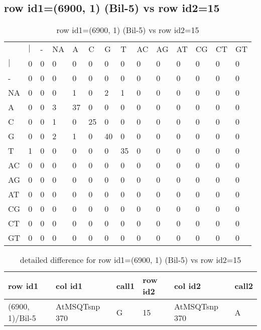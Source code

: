 \subsection{row id1=(6900, 1) (Bil-5) vs row id2=15}
\begin{center}
\begin{longtable}{|l|l|l|l|l|l|l|l|l|l|l|l|l|l|}
\caption{row id1=(6900, 1) (Bil-5) vs row id2=15} \label{table_dm66}\\
\hline
\\
\hline
&$|$&-&NA&A&C&G&T&AC&AG&AT&CG&CT&GT\\
$|$&0&0&0&0&0&0&0&0&0&0&0&0&0\\
-&0&0&0&0&0&0&0&0&0&0&0&0&0\\
NA&0&0&0&1&0&2&1&0&0&0&0&0&0\\
A&0&0&3&37&0&0&0&0&0&0&0&0&0\\
C&0&0&1&0&25&0&0&0&0&0&0&0&0\\
G&0&0&2&1&0&40&0&0&0&0&0&0&0\\
T&1&0&0&0&0&0&35&0&0&0&0&0&0\\
AC&0&0&0&0&0&0&0&0&0&0&0&0&0\\
AG&0&0&0&0&0&0&0&0&0&0&0&0&0\\
AT&0&0&0&0&0&0&0&0&0&0&0&0&0\\
CG&0&0&0&0&0&0&0&0&0&0&0&0&0\\
CT&0&0&0&0&0&0&0&0&0&0&0&0&0\\
GT&0&0&0&0&0&0&0&0&0&0&0&0&0\\
\hline
\end{longtable}
\end{center}

\begin{center}
\begin{longtable}{|l|l|l|l|l|l|}
\caption{detailed difference for row id1=(6900, 1) (Bil-5) vs row id2=15} \label{table_dm67}\\
\hline
row id1&col id1&call1&row id2&col id2&call2\\
\hline
(6900, 1)/Bil-5&AtMSQTsnp 370&G&15&AtMSQTsnp 370&A\\
\hline
\end{longtable}
\end{center}

